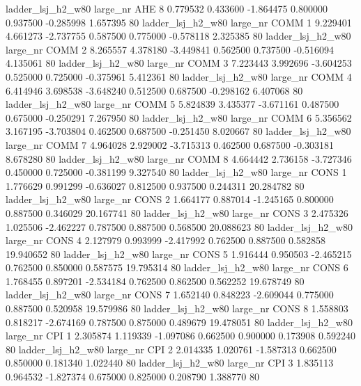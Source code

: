  ladder_lsj_h2_w80   large_nr      AHE                 8  0.779532  0.433600  -1.864475 0.800000 0.937500 -0.285998    1.657395 80
  ladder_lsj_h2_w80   large_nr     COMM                 1  9.229401  4.661273  -2.737755 0.587500 0.775000 -0.578118    2.325385 80
  ladder_lsj_h2_w80   large_nr     COMM                 2  8.265557  4.378180  -3.449841 0.562500 0.737500 -0.516094    4.135061 80
  ladder_lsj_h2_w80   large_nr     COMM                 3  7.223443  3.992696  -3.604253 0.525000 0.725000 -0.375961    5.412361 80
  ladder_lsj_h2_w80   large_nr     COMM                 4  6.414946  3.698538  -3.648240 0.512500 0.687500 -0.298162    6.407068 80
  ladder_lsj_h2_w80   large_nr     COMM                 5  5.824839  3.435377  -3.671161 0.487500 0.675000 -0.250291    7.267950 80
  ladder_lsj_h2_w80   large_nr     COMM                 6  5.356562  3.167195  -3.703804 0.462500 0.687500 -0.251450    8.020667 80
  ladder_lsj_h2_w80   large_nr     COMM                 7  4.964028  2.929002  -3.715313 0.462500 0.687500 -0.303181    8.678280 80
  ladder_lsj_h2_w80   large_nr     COMM                 8  4.664442  2.736158  -3.727346 0.450000 0.725000 -0.381199    9.327540 80
  ladder_lsj_h2_w80   large_nr     CONS                 1  1.776629  0.991299  -0.636027 0.812500 0.937500  0.244311   20.284782 80
  ladder_lsj_h2_w80   large_nr     CONS                 2  1.664177  0.887014  -1.245165 0.800000 0.887500  0.346029   20.167741 80
  ladder_lsj_h2_w80   large_nr     CONS                 3  2.475326  1.025506  -2.462227 0.787500 0.887500  0.568500   20.088623 80
  ladder_lsj_h2_w80   large_nr     CONS                 4  2.127979  0.993999  -2.417992 0.762500 0.887500  0.582858   19.940652 80
  ladder_lsj_h2_w80   large_nr     CONS                 5  1.916444  0.950503  -2.465215 0.762500 0.850000  0.587575   19.795314 80
  ladder_lsj_h2_w80   large_nr     CONS                 6  1.768455  0.897201  -2.534184 0.762500 0.862500  0.562252   19.678749 80
  ladder_lsj_h2_w80   large_nr     CONS                 7  1.652140  0.848223  -2.609044 0.775000 0.887500  0.520958   19.579986 80
  ladder_lsj_h2_w80   large_nr     CONS                 8  1.558803  0.818217  -2.674169 0.787500 0.875000  0.489679   19.478051 80
  ladder_lsj_h2_w80   large_nr      CPI                 1  2.305874  1.119339  -1.097086 0.662500 0.900000  0.173908    0.592240 80
  ladder_lsj_h2_w80   large_nr      CPI                 2  2.014335  1.020761  -1.587313 0.662500 0.850000  0.181340    1.022440 80
  ladder_lsj_h2_w80   large_nr      CPI                 3  1.835113  0.964532  -1.827374 0.675000 0.825000  0.208790    1.388770 80
